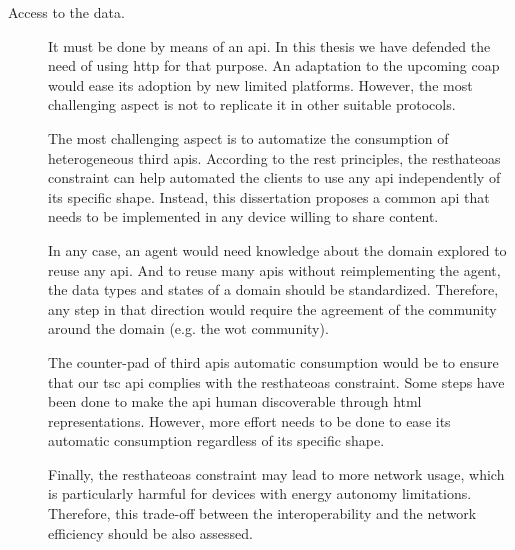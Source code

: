 \begin{description}
  \item[Access to the data.] It must be done by means of an \ac{api}.
			    In this thesis we have defended the need of using \ac{http} for that purpose.
			    An adaptation to the upcoming \ac{coap} would ease its adoption by new limited platforms. %
			    However, the most challenging aspect is not to replicate it in other suitable protocols.
			    
			    The most challenging aspect is to automatize the consumption of heterogeneous third \acp{api}.
			    According to the \ac{rest} principles, the \ac{resthateoas} constraint can help automated the clients to use any \ac{api} independently of its specific shape. %
			    Instead, this dissertation proposes a common \ac{api} that needs to be implemented in any device willing to share content. %
			    
			    In any case, an agent would need knowledge about the domain explored to reuse any \ac{api}.
			    And to reuse many \acp{api} without reimplementing the agent, the data types and states of a domain should be standardized. %
			    Therefore, any step in that direction would require the agreement of the community around the domain (e.g. the \ac{wot} community).
			    
			    The counter-pad of third \acp{api} automatic consumption would be to ensure that our \ac{tsc} \ac{api} complies with the \ac{resthateoas} constraint.
			    Some steps have been done to make the \ac{api} human discoverable through \ac{html} representations.
			    However, more effort needs to be done to ease its automatic consumption regardless of its specific shape. %
			    
			    Finally, the \ac{resthateoas} constraint may lead to more network usage, which is particularly harmful for devices with energy autonomy limitations.
			    Therefore, this trade-off between the interoperability and the network efficiency should be also assessed.
			    

\end{description}
